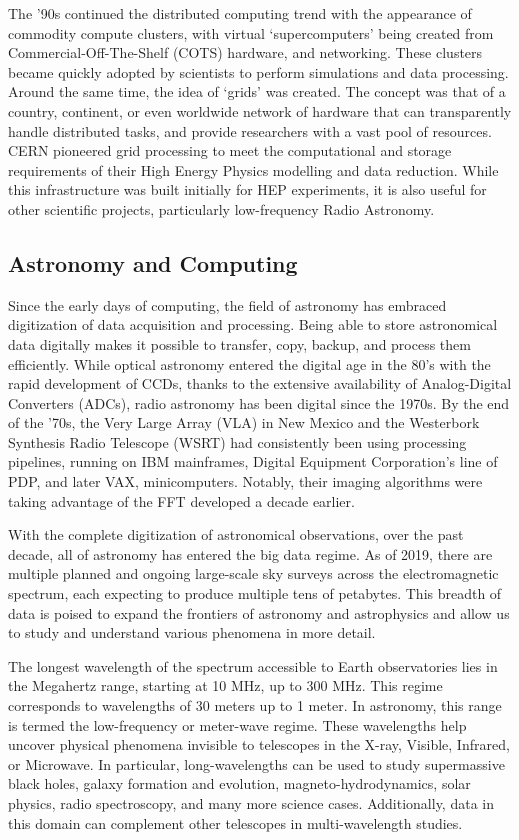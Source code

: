 The '90s continued the distributed computing trend with the appearance of commodity compute clusters, with virtual `supercomputers' being created from Commercial-Off-The-Shelf (COTS) hardware, and networking. These clusters became quickly adopted by scientists to perform simulations and data processing. Around the same time, the idea of `grids' was created\citep{cheng1989software}. The concept was that of a country, continent, or even worldwide network of hardware that can transparently handle distributed tasks, and provide researchers with a vast pool of resources. CERN pioneered grid processing to meet the computational and storage requirements of their High Energy Physics modelling and data reduction. While this infrastructure was built initially for HEP experiments, it is also useful for other scientific projects, particularly low-frequency Radio Astronomy. 


\subsection{Astronomy and Computing}

Since the early days of computing, the field of astronomy has embraced digitization of data acquisition and processing. Being able to store astronomical data digitally makes it possible to transfer, copy, backup, and process them efficiently. While optical astronomy entered the digital age in the 80's with the rapid development of CCDs, thanks to the extensive availability of Analog-Digital Converters (ADCs), radio astronomy has been digital since the 1970s. By the end of the '70s, the Very Large Array (VLA) in New Mexico and the Westerbork Synthesis Radio Telescope (WSRT) had consistently been using processing pipelines, running on IBM mainframes, Digital Equipment Corporation's line of PDP, and later VAX, minicomputers. Notably, their imaging algorithms were taking advantage of the FFT developed a decade earlier\citep{clark1980_clean}.

With the complete digitization of astronomical observations, over the past decade,  all of astronomy has entered the big data regime. As of 2019, there are multiple planned and ongoing large-scale sky surveys across the electromagnetic spectrum, each expecting to produce multiple tens of petabytes. This breadth of data is poised to expand the frontiers of astronomy and astrophysics and allow us to study and understand various phenomena in more detail.

The longest wavelength of the spectrum accessible to Earth observatories lies in the Megahertz range, starting at 10 MHz, up to 300 MHz. This regime corresponds to wavelengths of 30 meters up to 1 meter. In astronomy, this range is termed the low-frequency or meter-wave regime. These wavelengths help uncover physical phenomena invisible to telescopes in the X-ray, Visible, Infrared, or Microwave. In particular, long-wavelengths can be used to study supermassive black holes, galaxy formation and evolution, magneto-hydrodynamics, solar physics, radio spectroscopy, and many more science cases. Additionally, data in this domain can complement other telescopes in multi-wavelength studies.

